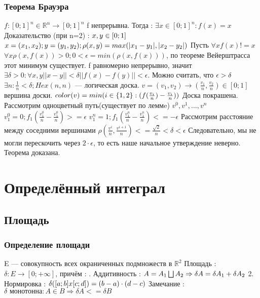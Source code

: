 \documentclass[12pt, a4paper]{article}
\newcommand{\nl}{\newline}
\begin{document}
        \subsubsection{Теорема Брауэра}
        $f : [0; 1]^n \in \mathbb{R}^n \rightarrow [0; 1]^n$ \nl
        f непрерывна. \nl
        Тогда : $\exists x \in [0; 1]^n : f(x) = x$ \nl
        Доказательство (при n=2) : \nl
        $x, y \in [0; 1] \nl$
        $x = (x_1, x_2); y = (y_1, y_2); \rho(x,y) = max(|x_1-y_1|, |x_2-y_2|) \nl$
        Пусть $ \forall x f(x) != x$ \nl
        $\forall x \rho(x, f(x))>0 ; 0 < \epsilon = min(\rho(x, f(x)))$, по теореме Вейерштрасса этот минимум существует. \nl
        f равномерно непрерывно, значит $\exists \delta > 0 : \forall x,y ||x-y|| < \delta ||f(x)-f(y)|| < \epsilon$. Можно считать, что $\epsilon > \delta \nl$
        $ \exists n : \frac{1}{n} < \delta; Hex(n , n)$ — логическая доска.
        $v = (v_1, v_2) \rightarrow (\frac{v_1}{n}, \frac{v_2}{n}) \in [0; 1]$ вершина доски. \nl
        $color(v) = min(i \in \{1, 2\} : (f(\frac{v_i}{n})-\frac{v_i}{n})) \nl$ 
        Доска покрашена. \nl
        Рассмотрим одноцветный путь(существует по леммe) $v^0, v^1, \ldots , v^n$ \nl
        $v^0_1 = 0; f_1(\frac{v^0_1}{n}-\frac{v^0_1}{n}) >=\epsilon$ \nl
        $v^n_1 = 1; f_1(\frac{v^n_1}{n}-\frac{v^n_1}{n}) <=-\epsilon$ \nl
        Рассмотрим расстояние между соседними вершинами \nl
        $\rho(\frac{v^i}{n}, \frac{v^{i+1}}{n}) <= \frac{\sqrt{2}}{n} < \delta < \epsilon$ \nl
        Следовательно, мы не могли перескочить через $2 \cdot \epsilon$, то есть наше начальное утверждение неверно. \nl
        Теорема доказана.
        
\section{Определённый интеграл}
    \subsection{Площадь}
        \subsubsection{Определение площади}
        E — совокупность всех окраниченных подмножеств в $\mathbb{R}^2$ \nl
        Площадь : $\delta : E \rightarrow [0; +\infty]$, причём : \nl
        1. Аддитивность : $A = A_1 \bigsqcup A_2 \Rightarrow \delta A = \delta A_1 + \delta A_2 \nl$
        2. Нормировка : $\delta([a; b] x [c; d]) = (b-a) \cdot (d-c) \nl$
            Замечание : $\delta \text{ монотонна} : A \in B \Rightarrow \delta A <= \delta B$
        
\end{document}

